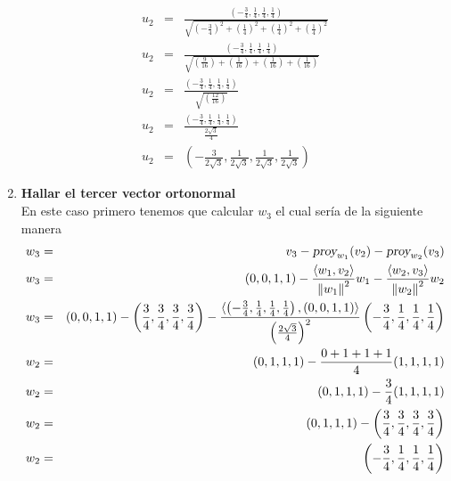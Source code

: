 \begin{enumerate}
\begin{eqnarray}
        {u}_{2} &=& \frac{\left(- \frac{3}{4}, \frac{1}{4}, \frac{1}{4}, \frac{1}{4} \right)}{\sqrt{{\left(-\frac{3}{4} \right)}^{2}+{\left(\frac{1}{4} \right)}^{2}+{\left(\frac{1}{4} \right)}^{2}+{\left(\frac{1}{4} \right)}^{2}}} \nonumber \\
        {u}_{2} &=& \frac{\left(- \frac{3}{4}, \frac{1}{4}, \frac{1}{4}, \frac{1}{4} \right)}{\sqrt{\left(\frac{9}{16}\right) + \left(\frac{1}{16}\right) + \left(\frac{1}{16}\right) + \left(\frac{1}{16}\right) }} \nonumber \\
        {u}_{2} &=& \frac{\left(- \frac{3}{4}, \frac{1}{4}, \frac{1}{4}, \frac{1}{4} \right)}{\sqrt{\left( \frac{12}{16} \right) }} \nonumber \\
        {u}_{2} &=& \frac{\left(- \frac{3}{4}, \frac{1}{4}, \frac{1}{4}, \frac{1}{4} \right)}{\frac{2\sqrt{3}}{4}} \nonumber \\
        {u}_{2} &=& \left(- \frac{3}{2 \sqrt{3}}, \frac{1}{2 \sqrt{3}}, \frac{1}{2 \sqrt{3}}, \frac{1}{2 \sqrt{3}} \right) \nonumber
    \end{eqnarray}
    \item \textbf{Hallar el tercer vector ortonormal}\\
    En este caso primero tenemos que calcular ${w}_{3}$ el cual sería de la siguiente manera
    \begin{eqnarray}
        {w}_{3} &=& {v}_{3} - {\textsl{proy}}_{{w}_{1}}({v}_{2}) - {\textsl{proy}}_{{w}_{2}}({v}_{3}) \nonumber \\
        {w}_{3} &=& (0,0,1,1) - \frac{\langle {w}_{1}, {v}_{2} \rangle}{{\| {w}_{1} \|}^{2}} {w}_{1} - \frac{\langle {w}_{2}, {v}_{3} \rangle}{{\| {w}_{2} \|}^{2}} {w}_{2} \nonumber \\
        {w}_{3} &=& (0,0,1,1) - \left( \frac{3}{4}, \frac{3}{4}, \frac{3}{4}, \frac{3}{4} \right) - \frac{\langle \left(- \frac{3}{4}, \frac{1}{4}, \frac{1}{4}, \frac{1}{4} \right), (0,0,1,1) \rangle}{{\left( \frac{2\sqrt{3}}{4} \right)}^{2}} \left(- \frac{3}{4}, \frac{1}{4}, \frac{1}{4}, \frac{1}{4} \right) \nonumber \\
        {w}_{2} &=& (0,1,1,1) - \frac{0+1+1+1}{4} (1,1,1,1) \nonumber \\
        {w}_{2} &=& (0,1,1,1) - \frac{3}{4} (1,1,1,1) \nonumber \\
        {w}_{2} &=& (0,1,1,1) - \left( \frac{3}{4}, \frac{3}{4}, \frac{3}{4}, \frac{3}{4} \right)  \nonumber \\
        {w}_{2} &=& \left(- \frac{3}{4}, \frac{1}{4}, \frac{1}{4}, \frac{1}{4} \right) \nonumber
    \end{eqnarray}

\end{enumerate}
